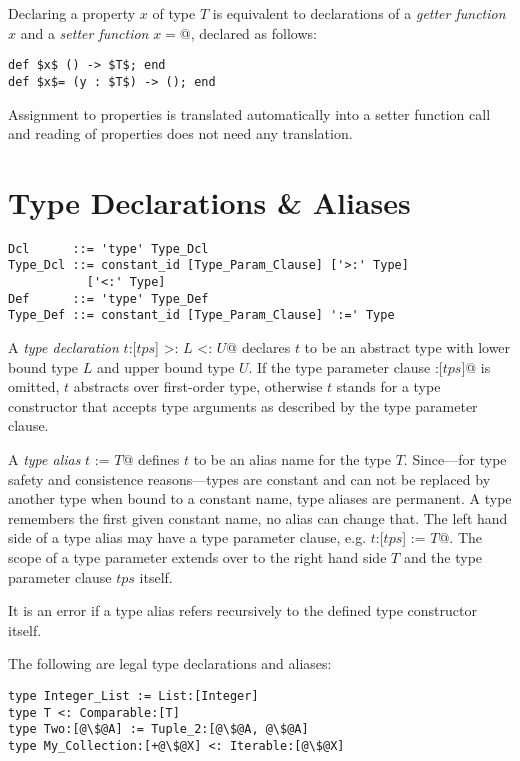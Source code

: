 Declaring a property $x$ of type $T$ is equivalent to declarations of a {\em getter function} $x$ and a {\em setter function} \lstinline@$x=$@, declared as follows:

\begin{lstlisting}
def $x$ () -> $T$; end
def $x$= (y : $T$) -> (); end
\end{lstlisting}

Assignment to properties is translated automatically into a setter function call and reading of properties does not need any translation. 

\section{Type Declarations \& Aliases}

\syntax\begin{lstlisting}
Dcl      ::= 'type' Type_Dcl
Type_Dcl ::= constant_id [Type_Param_Clause] ['>:' Type] 
           ['<:' Type]
Def      ::= 'type' Type_Def
Type_Def ::= constant_id [Type_Param_Clause] ':=' Type
\end{lstlisting}

A {\em type declaration} \lstinline@type $t$:[$tps$] >: $L$ <: $U$@ declares $t$ to be an abstract type with lower bound type $L$ and upper bound type $U$. If the type parameter clause \lstinline@:[$tps$]@ is omitted, $t$ abstracts over first-order type, otherwise $t$ stands for a type constructor that accepts type arguments as described by the type parameter clause. 

A {\em type alias} \lstinline@type $t$ := $T$@ defines $t$ to be an alias name for the type $T$. Since---for type safety and consistence reasons---types are constant and can not be replaced by another type when bound to a constant name, type aliases are permanent. A type remembers the first given constant name, no alias can change that. The left hand side of a type alias may have a type parameter clause, e.g. \lstinline@type $t$:[$tps$] := $T$@. The scope of a type parameter extends over to the right hand side $T$ and the type parameter clause $tps$ itself. 

It is an error if a type alias refers recursively to the defined type constructor itself. 

\example The following are legal type declarations and aliases:
\begin{lstlisting}[escapechar=@]
type Integer_List := List:[Integer]
type T <: Comparable:[T]
type Two:[@\$@A] := Tuple_2:[@\$@A, @\$@A]
type My_Collection:[+@\$@X] <: Iterable:[@\$@X]
\end{lstlisting}


